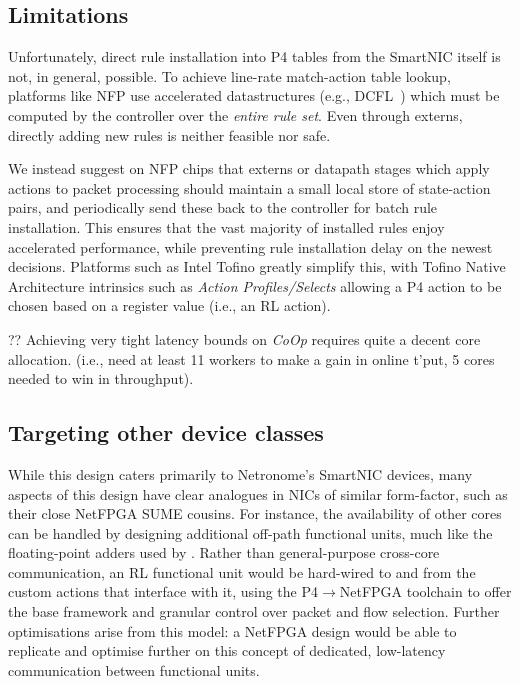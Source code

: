 \documentclass[sigconf,natbib=false]{acmart}
\newcommand{\Coopfw}{\emph{CoOp}}
\begin{document}
%
%
%

\subsection{Limitations}\label{sec:limitations}
Unfortunately, direct rule installation into P4 tables from the SmartNIC itself is not, in general, possible.
To achieve line-rate match-action table lookup, platforms like NFP use accelerated datastructures (e.g., DCFL~\parencite{DBLP:conf/infocom/TaylorT05}) which must be computed by the controller over the \emph{entire rule set}.
Even through externs, directly adding new rules is neither feasible nor safe.

We instead suggest on NFP chips that externs or datapath stages which apply actions to packet processing should maintain a small local store of state-action pairs, and periodically send these back to the controller for batch rule installation.
This ensures that the vast majority of installed rules enjoy accelerated performance, while preventing rule installation delay on the newest decisions.
Platforms such as Intel Tofino greatly simplify this, with Tofino Native Architecture intrinsics such as \emph{Action Profiles/Selects} allowing a P4 action to be chosen based on a register value (i.e., an RL action).

?? Achieving very tight latency bounds on \Coopfw{} requires quite a decent core allocation. (i.e., need at least 11 workers to make a gain in online t'put, 5 cores needed to win in throughput).

\subsection{Targeting other device classes}
While this design caters primarily to Netronome's SmartNIC devices, many aspects of this design have clear analogues in NICs of similar form-factor, such as their close NetFPGA SUME cousins.
For instance, the availability of other cores can be handled by designing additional off-path functional units, much like the floating-point adders used by \textcite{DBLP:conf/isca/LiLYCSH19}.
Rather than general-purpose cross-core communication, an RL functional unit would be hard-wired to and from the custom actions that interface with it, using the P4$\rightarrow$NetFPGA toolchain to offer the base framework and granular control over packet and flow selection.
Further optimisations arise from this model: a NetFPGA design would be able to replicate and optimise further on this concept of dedicated, low-latency communication between functional units.
\end{document}
